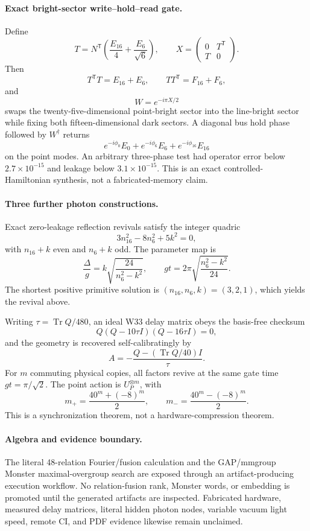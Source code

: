 \paragraph{Exact bright-sector write--hold--read gate.}
Define
\[
 T=N^{\mathsf T}\left(\frac{E_{16}}4+\frac{E_6}{\sqrt6}\right),
\qquad
 X=\begin{pmatrix}0&T^{\mathsf T}\\T&0\end{pmatrix}.
\]
Then
\[
 T^{\mathsf T}T=E_{16}+E_6,
 \qquad TT^{\mathsf T}=F_{16}+F_6,
\]
and
\[
 \boxed{W=e^{-i\pi X/2}}
\]
swaps the twenty-five-dimensional point-bright sector into the
line-bright sector while fixing both fifteen-dimensional dark sectors.
A diagonal bus hold phase followed by $W^\dagger$ returns
\[
 \boxed{e^{-i\phi_0}E_0+e^{-i\phi_6}E_6+e^{-i\phi_{16}}E_{16}}
\]
on the point modes.  An arbitrary three-phase test had operator error
below $2.7\times10^{-15}$ and leakage below $3.1\times10^{-15}$.  This
is an exact controlled-Hamiltonian synthesis, not a fabricated-memory
claim.

\paragraph{Three further photon constructions.}
Exact zero-leakage reflection revivals satisfy the integer quadric
\[
 \boxed{3n_{16}^2-8n_6^2+5k^2=0},
\]
with $n_{16}+k$ even and $n_6+k$ odd.  The parameter map is
\[
 \frac{\Delta}{g}=k\sqrt{\frac{24}{n_6^2-k^2}},
 \qquad
 gt=2\pi\sqrt{\frac{n_6^2-k^2}{24}}.
\]
The shortest positive primitive solution is $(n_{16},n_6,k)=(3,2,1)$,
which yields the revival above.

Writing $\tau=\operatorname{Tr}Q/480$, an ideal W33 delay matrix obeys
the basis-free checksum
\[
 \boxed{Q(Q-10\tau I)(Q-16\tau I)=0},
\]
and the geometry is recovered self-calibratingly by
\[
 \boxed{A=-\frac{Q-(\operatorname{Tr}Q/40)I}{\tau}}.
\]
For $m$ commuting physical copies, all factors revive at the same gate
time $gt=\pi/\sqrt2$.  The point action is $U_P^{\otimes m}$, with
\[
 \boxed{m_+=\frac{40^m+(-8)^m}{2},\qquad
 m_-=\frac{40^m-(-8)^m}{2}}.
\]
This is a synchronization theorem, not a hardware-compression theorem.

\paragraph{Algebra and evidence boundary.}
The literal 48-relation Fourier/fusion calculation and the GAP/mmgroup
Monster maximal-overgroup search are exposed through an artifact-producing
execution workflow.  No relation-fusion rank, Monster words, or embedding
is promoted until the generated artifacts are inspected.  Fabricated
hardware, measured delay matrices, literal hidden photon nodes, variable
vacuum light speed, remote CI, and PDF evidence likewise remain unclaimed.

